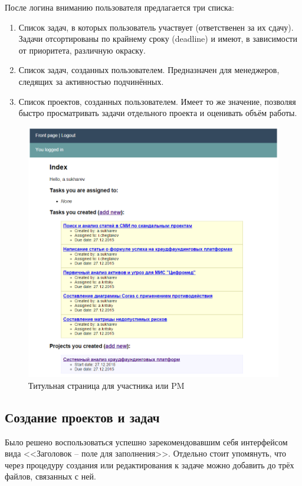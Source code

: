 \documentclass[a4paper, 14pt]{extarticle}
\begin{document}
После логина вниманию пользователя предлагается три списка:

\begin{enumerate}
\item Список задач, в которых пользователь участвует (ответственен за их сдачу). Задачи отсортированы по крайнему сроку (deadline) и имеют, в зависимости от приоритета, различную окраску.
\item Список задач, созданных пользователем. Предназначен для менеджеров, следящих за активностью подчинённых.
\item Список проектов, созданных пользователем. Имеет то же значение, позволяя быстро просматривать задачи отдельного проекта и оценивать объём работы.
\end{enumerate}

\begin{figure}[!htb]
  \centering
    \includegraphics[scale=0.8]{../shared_images/frontend/title-logged-in.png}
   \caption{Титульная страница для участника или PM}
    \label{fig:start}
\end{figure}

\subsection{Создание проектов и задач}
Было решено воспользоваться успешно зарекомендовавшим себя интерфейсом вида <<Заголовок -- поле для заполнения>>. Отдельно стоит упомянуть, что через процедуру создания или редактирования к задаче можно добавить до трёх файлов, связанных с ней.
\end{document}
